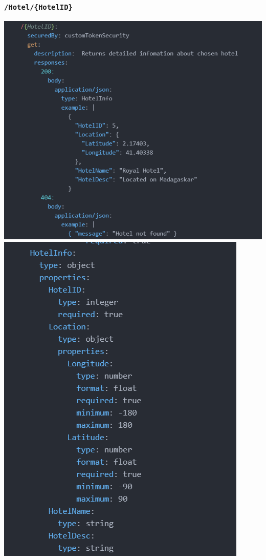 \documentclass{article}
\begin{document}
\subsubsection{\texttt{/Hotel/\{HotelID\}}}
\includegraphics[width=\linewidth]{Oferta+Hotel-Raml/HotelID_Raml.png}
\newpage
\includegraphics[width=\linewidth]{Oferta+Hotel-Raml/HotelInfo_Raml.png}
\end{document}
